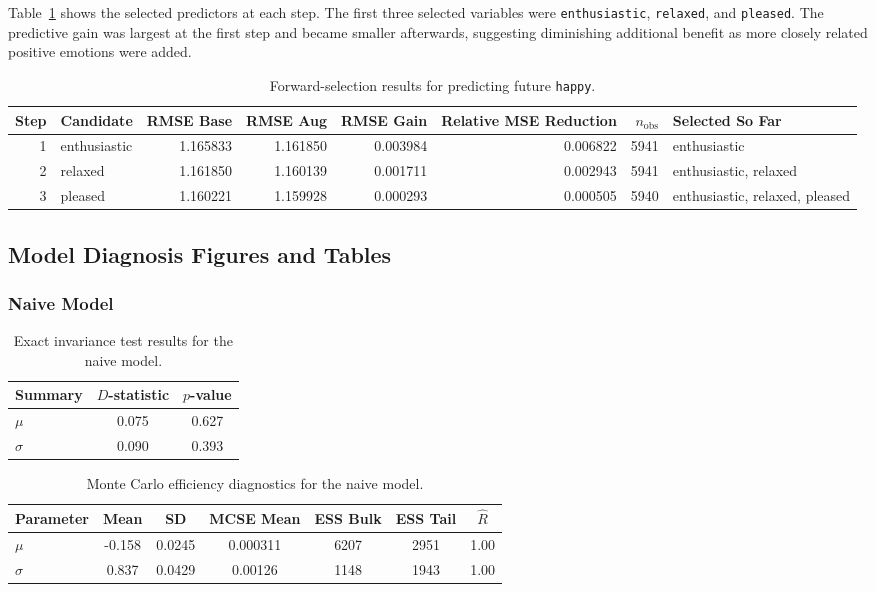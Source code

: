\documentclass[12pt,letterpaper,fleqn]{article}
\begin{document}
Table~\ref{tab:forward_selection_happy} shows the selected predictors at each step. The first three selected variables were \texttt{enthusiastic}, \texttt{relaxed}, and \texttt{pleased}. The predictive gain was largest at the first step and became smaller afterwards, suggesting diminishing additional benefit as more closely related positive emotions were added.

\begin{table}[htbp]
\scriptsize
\centering
\caption{Forward-selection results for predicting future \texttt{happy}.}
\label{tab:forward_selection_happy}
\begin{tabular}{r l r r r r r l}
\hline
Step & Candidate & RMSE Base & RMSE Aug & RMSE Gain & Relative MSE Reduction & \(n_{\text{obs}}\) & Selected So Far \\
\hline
1 & enthusiastic & 1.165833 & 1.161850 & 0.003984 & 0.006822 & 5941 & enthusiastic \\
2 & relaxed      & 1.161850 & 1.160139 & 0.001711 & 0.002943 & 5941 & enthusiastic, relaxed \\
3 & pleased      & 1.160221 & 1.159928 & 0.000293 & 0.000505 & 5940 & enthusiastic, relaxed, pleased \\
\hline
\end{tabular}
\end{table}

\subsection{Model Diagnosis Figures and Tables}


\subsubsection{Naive Model}
\begin{table}[htbp]
\centering
\caption{Exact invariance test results for the naive model.}
\label{tab:naive_invariance}
\begin{tabular}{lcc}
\hline
Summary & $D$-statistic & $p$-value \\
\hline
$\mu$    & 0.075 & 0.627 \\
$\sigma$ & 0.090 & 0.393 \\
\hline
\end{tabular}
\end{table}

\begin{table}[htbp]
\centering
\caption{Monte Carlo efficiency diagnostics for the naive model.}
\label{tab:naive_ess}
\begin{tabular}{lcccccc}
\hline
Parameter & Mean & SD & MCSE Mean & ESS Bulk & ESS Tail & $\hat{R}$ \\
\hline
$\mu$    & -0.158 & 0.0245 & 0.000311 & 6207 & 2951 & 1.00 \\
$\sigma$ & 0.837  & 0.0429 & 0.00126  & 1148 & 1943 & 1.00 \\
\hline
\end{tabular}
\end{table}
\end{document}
